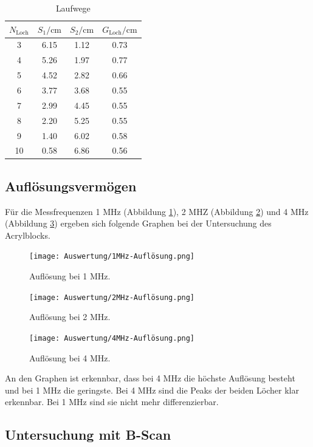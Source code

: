 \begin{table}[H]
\centering
\caption{Laufwege }
\label{tab:12}
	\begin{tabular}{c|c|c|c}
		\toprule
		{$N_\text{Loch}$} & {$S_1 / \text{cm}$} & {$S_2 / \text{cm}$} & {$G_\text{Loch} / \text{cm}$}\\
		\hline
        	\midrule
	3&6.15&1.12&0.73 \\
	4 &5.26&1.97&0.77\\
	5 &4.52&2.82&0.66\\
	6 &3.77&3.68&0.55\\
	7 &2.99&4.45&0.55\\
	8 &2.20&5.25&0.55\\
	9 &1.40&6.02&0.58\\
	10 &0.58&6.86&0.56\\
	\bottomrule 
	\end{tabular}
\end{table}

\subsection{Auflösungsvermögen}


Für die Messfrequenzen 1 MHz (Abbildung \ref{fig:1MHz}), 2 MHZ (Abbildung \ref{fig:2MHz}) und 4 MHz (Abbildung \ref{fig:4MHz}) ergeben sich folgende Graphen bei der Untersuchung des Acrylblocks.

 \begin{figure}[H]
		\centering
		\texttt{[image: Auswertung/1MHz-Auflösung.png]}
		\caption{Auflösung bei 1 MHz.}
		\label{fig:1MHz}
\end{figure}
\begin{figure}[H]
		\centering
		\texttt{[image: Auswertung/2MHz-Auflösung.png]}
		\caption{Auflösung bei 2 MHz.}
		\label{fig:2MHz}
\end{figure}
 \begin{figure}[H]
	\centering
	\texttt{[image: Auswertung/4MHz-Auflösung.png]}
	\caption{Auflösung bei 4 MHz.}
	\label{fig:4MHz}
\end{figure}

An den Graphen ist erkennbar, dass bei 4 MHz die höchste Auflösung besteht und bei 1 MHz die geringste. Bei 4 MHz sind die Peaks der beiden Löcher klar erkennbar. Bei 1 MHz sind sie nicht mehr differenzierbar. 

\subsection{Untersuchung mit B-Scan}

